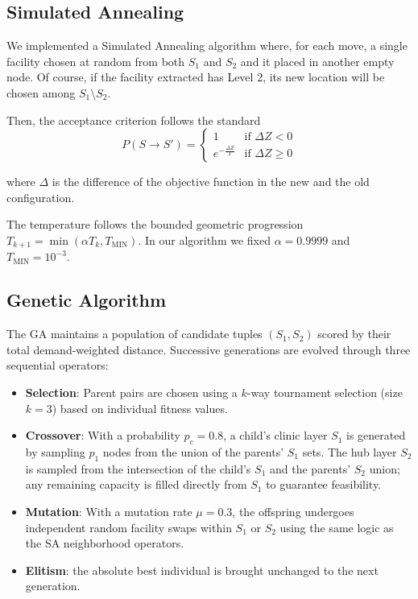 \documentclass[a4paper,11pt, twocolumn]{article}
\begin{document}
\subsection{Simulated Annealing}
We implemented a Simulated Annealing algorithm where, for each move, a single facility chosen at random from both $S_1$ and $S_2$ and it placed in another empty node. Of course, if the facility extracted has Level 2, its new location will be chosen among $S_1 \setminus S_2$. 

Then, the acceptance criterion follows the standard
\vspace{-0.2cm}
\[ 
      P(S \to S') = 
      \begin{cases} 
      1 & \text{if } \Delta Z < 0 \\
      e^{-\frac{\Delta Z}{T}} & \text{if } \Delta Z \geq 0 
      \end{cases}
\]

where $\Delta$ is the difference of the objective function in the new and the old configuration.

The temperature follows the bounded geometric progression $T_{k+1} = \min (\alpha T_k, T_{\text{MIN}})$. In our algorithm we fixed $\alpha = 0.9999$ and $T_{\text{MIN}} = 10^{-3}$.

\subsection{Genetic Algorithm}
The GA maintains a population of candidate tuples $(S_1, S_2)$ scored by their total demand-weighted distance. Successive generations are evolved through three sequential operators:
\begin{itemize}
    \item \textbf{Selection}: Parent pairs are chosen using a $k$-way tournament selection (size $k=3$) based on individual fitness values.
    \item \textbf{Crossover}: With a probability $p_c = 0.8$, a child's clinic layer $S_1$ is generated by sampling $p_1$ nodes from the union of the parents' $S_1$ sets. The hub layer $S_2$ is sampled from the intersection of the child's $S_1$ and the parents' $S_2$ union; any remaining capacity is filled directly from $S_1$ to guarantee feasibility.
    \item \textbf{Mutation}: With a mutation rate $\mu = 0.3$, the offspring undergoes independent random facility swaps within $S_1$ or $S_2$ using the same logic as the SA neighborhood operators.
    \item \textbf{Elitism}: the absolute best individual is brought unchanged to the next generation.
\end{itemize}
\end{document}
